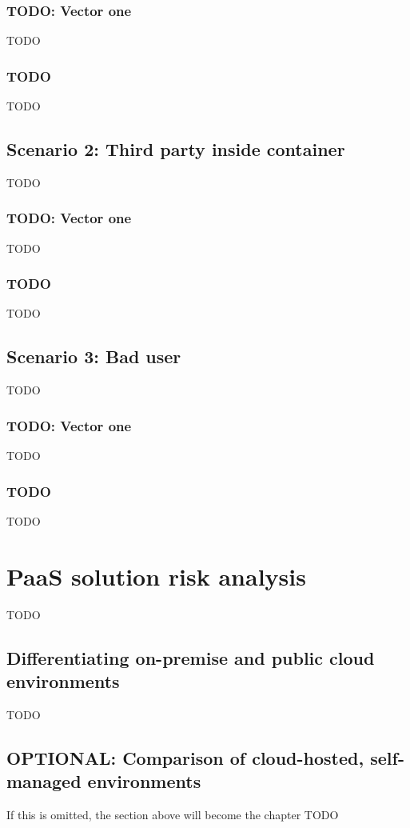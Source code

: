 \subsection{TODO: Vector one}
TODO

\subsection{TODO}
TODO

\section{Scenario 2: Third party inside container}
TODO

\subsection{TODO: Vector one}
TODO

\subsection{TODO}
TODO

\section{Scenario 3: Bad user}
TODO

\subsection{TODO: Vector one}
TODO

\subsection{TODO}
TODO

\chapter{PaaS solution risk analysis}
TODO

\section{Differentiating on-premise and public cloud environments}
TODO

\section{OPTIONAL: Comparison of cloud-hosted, self-managed environments}
If this is omitted, the section above will become the chapter
TODO


